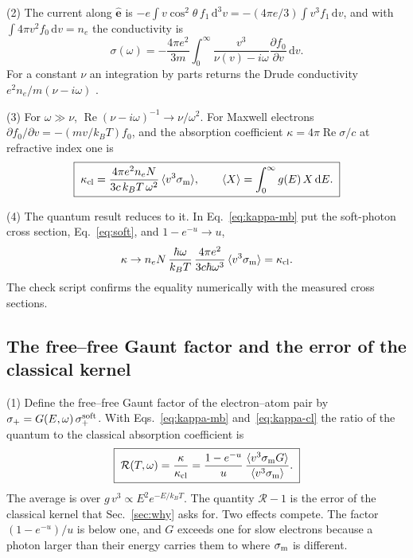 \documentclass[11pt]{article}
\numberwithin{equation}{section}
\newcommand{\ehat}{\hat{\mathbf e}}
\newcommand{\dd}{\mathrm d}
\newcommand{\kB}{k_B}
\newcommand{\sm}{\sigma_{\rm m}}
\DeclareMathOperator{\Real}{Re}
\begin{document}
{\noindent}(2) The current along $\ehat$ is $-e\int v\cos^2\theta\,f_1\,\dd^3v
=-(4\pi e/3)\int v^3f_1\,\dd v$, and with $\int4\pi v^2f_0\,\dd v=n_e$ the
conductivity is
\begin{equation}
\sigma(\omega)=-\frac{4\pi e^2}{3m}\int_0^\infty\frac{v^3}{\nu(v)-i\omega}
\frac{\partial f_0}{\partial v}\,\dd v .
\label{eq:allis}
\end{equation}
For a constant $\nu$ an integration by parts returns the Drude conductivity
$e^2n_e/m(\nu-i\omega)$ \cite{Atzeni2004}.

{\noindent}(3) For $\omega\gg\nu$, $\Real(\nu-i\omega)^{-1}\to\nu/\omega^2$. For
Maxwell electrons $\partial f_0/\partial v=-(mv/\kB T)f_0$, and the
absorption coefficient $\kappa=4\pi\Real\sigma/c$ at refractive index one is
\begin{equation}
\boxed{\;\kappa_{\rm cl}=\frac{4\pi e^2n_eN}{3c\,\kB T\,\omega^2}\,\langle v^3\sm\rangle,
\qquad\langle X\rangle=\int_0^\infty g(E)\,X\,\dd E .\;}
\label{eq:kappa-cl}
\end{equation}

{\noindent}(4) The quantum result reduces to it. In Eq.~\eqref{eq:kappa-mb}
put the soft-photon cross section, Eq.~\eqref{eq:soft}, and $1-e^{-u}\to u$,
\begin{equation}
\kappa\to n_eN\,\frac{\hbar\omega}{\kB T}\,\frac{4\pi e^2}{3c\hbar\omega^3}\,
\langle v^3\sm\rangle=\kappa_{\rm cl}.
\end{equation}
The check script confirms the equality numerically with the measured cross
sections.

\subsection{The free--free Gaunt factor and the error of the classical kernel}
{\noindent}(1) Define the free--free Gaunt factor of the electron--atom pair
by $\sigma_+=G(E,\omega)\,\sigma_+^{\rm soft}$. With Eqs.~\eqref{eq:kappa-mb}
and~\eqref{eq:kappa-cl} the ratio of the quantum to the classical absorption
coefficient is
\begin{equation}
\boxed{\;\mathcal R(T,\omega)=\frac{\kappa}{\kappa_{\rm cl}}
=\frac{1-e^{-u}}{u}\,\frac{\langle v^3\sm G\rangle}{\langle v^3\sm\rangle}.\;}
\label{eq:R}
\end{equation}
The average is over $g\,v^3\propto E^2e^{-E/\kB T}$. The quantity $\mathcal R-1$
is the error of the classical kernel that Sec.~\ref{sec:why} asks for. Two effects
compete. The factor $(1-e^{-u})/u$ is below one, and $G$ exceeds one for slow
electrons because a photon larger than their energy carries them to where
$\sm$ is different.
\end{document}
